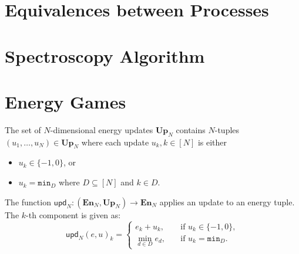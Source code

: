 
\section{Equivalences between Processes}

\section{Spectroscopy Algorithm}

\section{Energy Games} \label{sec:energy_games}

\begin{definition} \label{def:update}
    The set of $N$-dimensional energy updates $\mathbf{Up}_N$ contains
    $N$-tuples $(u_1, \ldots, u_N) \in \mathbf{Up}_N$ where each update $u_k, k
    \in [N]$ is
    either
    \begin{itemize}
        \item $u_k \in \{-1, 0\}$, or
        \item $u_k = \mathtt{min}_D$ where $D \subseteq [N]$ and $k \in D$.
    \end{itemize}

    The function
    $\mathsf{upd}_N: (\mathbf{En}_N, \mathbf{Up}_N) \rightarrow \mathbf{En}_N$
    applies an update to an energy tuple.
    The $k$-th component is given as:
    \begin{equation*}
        \mathsf{upd}_N(e, u)_k =
        \begin{cases}
            e_k + u_k,\quad &\text{if } u_k \in \{-1, 0\}, \\
            \min_{d \in D}{e_d},\quad &\text{if } u_k = \mathtt{min}_D.
        \end{cases}
    \end{equation*}
\end{definition}

